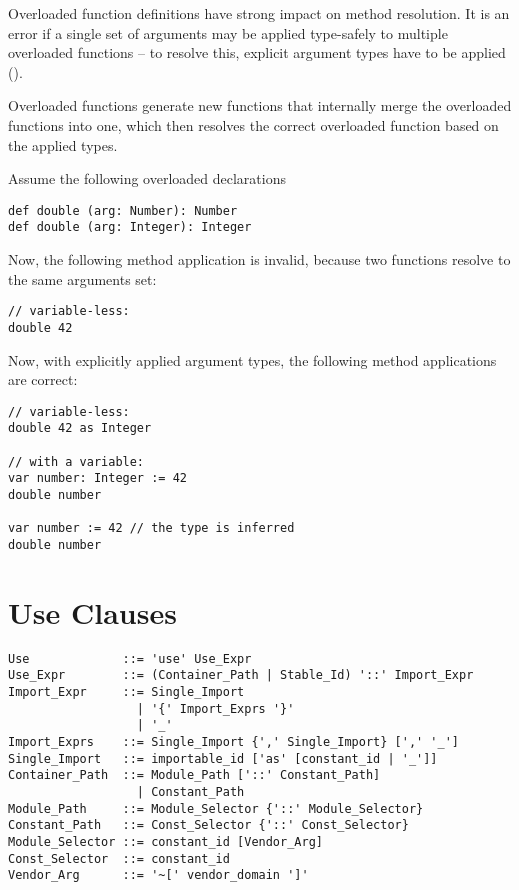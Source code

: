 Overloaded function definitions have strong impact on method resolution. It is an error if a single set of arguments may be applied type-safely to multiple overloaded functions -- to resolve this, explicit argument types have to be applied ().

Overloaded functions generate new functions that internally merge the overloaded functions into one, which then resolves the correct overloaded function based on the applied types.

\example Assume the following overloaded declarations
\begin{lstlisting}
def double (arg: Number): Number
def double (arg: Integer): Integer
\end{lstlisting}
Now, the following method application is invalid, because two functions resolve to the same arguments set: 
\begin{lstlisting}
// variable-less:
double 42
\end{lstlisting}
Now, with explicitly applied argument types, the following method applications are correct:
\begin{lstlisting}
// variable-less:
double 42 as Integer

// with a variable:
var number: Integer := 42
double number

var number := 42 // the type is inferred
double number
\end{lstlisting}

\section{Use Clauses}
\label{sec:use-clauses}

\syntax\begin{lstlisting}
Use             ::= 'use' Use_Expr
Use_Expr        ::= (Container_Path | Stable_Id) '::' Import_Expr
Import_Expr     ::= Single_Import
                  | '{' Import_Exprs '}'
                  | '_'
Import_Exprs    ::= Single_Import {',' Single_Import} [',' '_']
Single_Import   ::= importable_id ['as' [constant_id | '_']]
Container_Path  ::= Module_Path ['::' Constant_Path]
                  | Constant_Path
Module_Path     ::= Module_Selector {'::' Module_Selector}
Constant_Path   ::= Const_Selector {'::' Const_Selector}
Module_Selector ::= constant_id [Vendor_Arg]
Const_Selector  ::= constant_id
Vendor_Arg      ::= '~[' vendor_domain ']'
\end{lstlisting}

